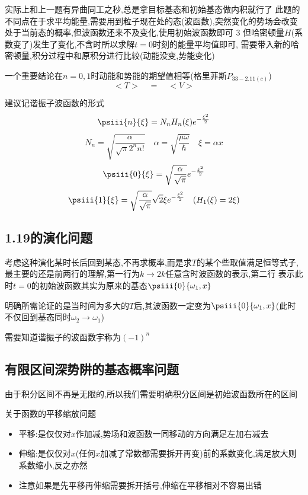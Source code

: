             实际上和上一题有异曲同工之秒,总是拿目标基态和初始基态做内积就行了
            此题的不同点在于求平均能量,需要用到粒子现在处的态(波函数),突然变化的势场会改变处于当前态的概率,但波函数还来不及变化,使用初始波函数即可
            3
            但哈密顿量$H$(系数变了)发生了变化,不含时所以求解$t=0$时刻的能量平均值即可,
            需要带入新的哈密顿量,积分过程中和原积分进行比较(动能没变,势能变化)
            
            一个重要结论在$n=0,1$时动能和势能的期望值相等(格里菲斯$P_{33-2.11(c)}$)
            $$ <T> \quad = \quad  <V> $$

            建议记谐振子波函数的形式
            $$ \psiii{n}{\xi} = N_{n} H_{n}(\xi) e^{-\frac{\xi^{2}}{2}} $$
            $$ N_{n} = \sqrt{\frac{\alpha}{\sqrt{\pi}2^{n} n!}}  \quad \alpha = \sqrt{\frac{\mu \omega}{\hbar}} \quad \xi = \alpha x $$
            $$ \psiii{0}{\xi} = \sqrt{\frac{\alpha}{\sqrt{\pi}}} e^{-\frac{\xi^{2}}{2}} $$
            $$ \psiii{1}{\xi} = \sqrt{\frac{\alpha}{\sqrt{\pi}}} \sqrt{2} \xi e^{-\frac{\xi^{2}}{2}} \quad (H_{1}(\xi) = 2\xi) $$
            
        \subsection{1.19的演化问题}
            考虑这种演化某时长后回到某态,不再求概率,而是求$T$的某个些取值满足恒等式子,最主要的还是前两行的理解,第一行为$k \to 2k$任意含时波函数的表示,第二行
            表示此时$t = 0$的初始波函数其实为原来的基态$\psiii{0}{\omega_{1},x}$
            
            明确所需论证的是当时间为多大的$T$后,其波函数一定变为$\psiii{0}{\omega_{1},x}$(此时不仅回到基态同时$\omega_{2} \to \omega_{1}$)

            需要知道谐振子的波函数宇称为$(-1)^{n}$

        \subsection{有限区间深势阱的基态概率问题}
            由于积分区间不再是无限的,所以我们需要明确积分区间是初始波函数所在的区间
            
            关于函数的平移缩放问题
            \begin{itemize}
                \item 平移:是仅仅对$x$作加减,势场和波函数一同移动的方向满足左加右减去
                \item 伸缩:是仅仅对$x$(任何$x$加减了常数都需要拆开再变)前的系数变化,满足放大则系数缩小,反之亦然
                \item 注意如果是先平移再伸缩需要拆开括号,伸缩在平移相对不容易出错
            \end{itemize}


